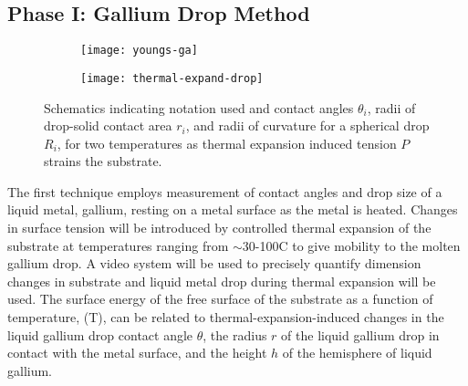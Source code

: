 
\subsection{Phase I: Gallium Drop Method}


\begin{wrapfigure}[12]{R}{0.5\linewidth}
	\begin{subfigure}[b]{0.5\textwidth}
		\texttt{[image: youngs-ga]}
		\label{fig:youngs-ga}
	\end{subfigure}
	\begin{subfigure}[b]{0.5\textwidth}
		\texttt{[image: thermal-expand-drop]}
		\label{fig:thermal-expand-drop}
	\end{subfigure}
	\caption{Schematics indicating notation used and contact angles $\theta_{i}$, radii of drop-solid contact area $r_{i}$, and radii of curvature for a spherical drop $R_{i}$, for two temperatures as thermal expansion induced tension $P$ strains the substrate.}
	\label{fig:therm-exp-ga}
\end{wrapfigure}
The first technique employs measurement of contact angles and drop size of a liquid metal, gallium, resting on a metal surface as the metal is heated. Changes in surface tension will be introduced by controlled thermal expansion of the substrate at temperatures ranging from $\sim$30-100\degree C to give mobility to the molten gallium drop.
A video system will be used to precisely quantify dimension changes in substrate and liquid metal drop during thermal expansion will be used. The surface energy of the free surface of the substrate as a function of temperature, \gamSV(T), can be related to thermal-expansion-induced changes in the liquid gallium drop contact angle $\theta$, the radius $r$ of the liquid gallium drop in contact with the metal surface, and the height $h$ of the hemisphere of liquid gallium. 

